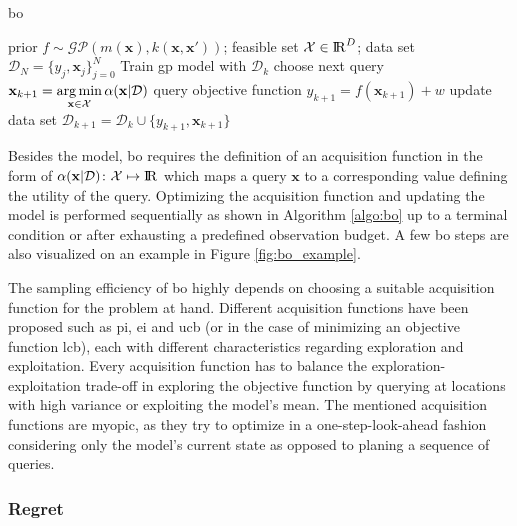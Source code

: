 \begin{algorithm}[b]
\centering
\caption{\gls{bo} \cite{Shahriari_2016}}
\begin{algorithmic}[1]
\Require prior $f \sim \mathcal{GP}(m(\mathbf{x}), k(\mathbf{x},\mathbf{x}'))$; feasible set $\mathcal{X}\in \mathrm{I\!R}^D$; data set ${\mathcal{D}_{N} = \{y_j, \mathbf{x}_j\}_{j=0}^{N}}$ 
    \State Train \gls{gp} model with $\mathcal{D}_k$
    \State choose next query $\mathbf{x}_{k+1} = \underset{\mathbf{x}\in \mathcal{X}}{\arg\min} \,\alpha(\mathbf{x}|\mathcal{D})$
    \State query objective function $y_{k+1} = f(\mathbf{x}_{k+1}) + w$
    \State update data set $\mathcal{D}_{k+1} = \mathcal{D}_{k} \cup \{y_{k+1}, \mathbf{x}_{k+1}\}$
\EndFor
\end{algorithmic}
\label{algo:bo}
\end{algorithm}

Besides the model, \gls{bo} requires the definition of an acquisition function in the form of $\alpha(\mathbf{x}|\mathcal{D}) \colon \mathcal{X} \mapsto \mathrm{I\!R}$ which maps a query $\mathbf{x}$ to a corresponding value defining the utility of the query. Optimizing the acquisition function and updating the model is performed sequentially as shown in Algorithm \ref{algo:bo} up to a terminal condition or after exhausting a predefined observation budget. A few \gls{bo} steps are also visualized on an example in Figure \ref{fig:bo_example}.


The sampling efficiency of \gls{bo} highly depends on choosing a suitable acquisition function for the problem at hand. Different acquisition functions have been proposed such as \gls{pi}\cite{Kushner_1964}, \gls{ei}\cite{} and \gls{ucb}\cite{Auer_2002} (or in the case of minimizing an objective function \gls{lcb}), each with different characteristics regarding exploration and exploitation. Every acquisition function has to balance the exploration-exploitation trade-off in exploring the objective function by querying at locations with high variance or exploiting the model's mean. The mentioned acquisition functions are myopic, as they try to optimize in a one-step-look-ahead fashion considering only the model's current state as opposed to planing a sequence of queries.


\subsubsection{Regret}

